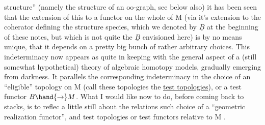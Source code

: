 structure'' (namely the structure of an $\mathrm{oo}$-graph, see below also)\over{,}{;} it
has been seen that the extension of this to a functor on the whole of
M (via it's extension to the  coherator defining the structure species,
which we denoted by $\underline{B}$ at the beginning of these notes, but which is
not quite the $\underline{B}$ envisioned here) is by no means unique, that it depends
on a pretty big bunch of rather arbitrary choices. This indeterminacy
now appears as quite in keeping with the general aspect of a (still
somewhat hypothetical) theory of algebraic homotopy models, gradually
emerging from darkness. It parallels the corresponding indeterminacy
in the choice of an ``eligible'' topology on M (call these topologies
the \uline{test topologies}), or   a test functor $B \hand{\to} M$. What I would
like now to do, before coming back to stacks, is to reflec a little
still about the relations   such choice of a ``geometric realization
functor'', and test topologies or test functors relative to M .
